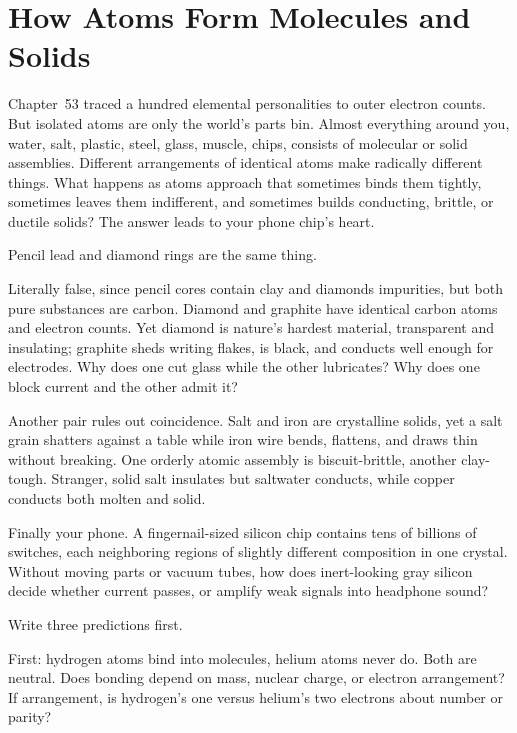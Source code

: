 \chapter{How Atoms Form Molecules and Solids}

Chapter~53 traced a hundred elemental personalities to outer electron counts. But isolated atoms are only the world's parts bin. Almost everything around you, water, salt, plastic, steel, glass, muscle, chips, consists of molecular or solid assemblies. Different arrangements of identical atoms make radically different things. What happens as atoms approach that sometimes binds them tightly, sometimes leaves them indifferent, and sometimes builds conducting, brittle, or ductile solids? The answer leads to your phone chip's heart.


Pencil lead and diamond rings are the same thing.

Literally false, since pencil cores contain clay and diamonds impurities, but both pure substances are carbon. Diamond and graphite have identical carbon atoms and electron counts. Yet diamond is nature's hardest material, transparent and insulating; graphite sheds writing flakes, is black, and conducts well enough for electrodes. Why does one cut glass while the other lubricates? Why does one block current and the other admit it?

Another pair rules out coincidence. Salt and iron are crystalline solids, yet a salt grain shatters against a table while iron wire bends, flattens, and draws thin without breaking. One orderly atomic assembly is biscuit-brittle, another clay-tough. Stranger, solid salt insulates but saltwater conducts, while copper conducts both molten and solid.

Finally your phone. A fingernail-sized silicon chip contains tens of billions of switches, each neighboring regions of slightly different composition in one crystal. Without moving parts or vacuum tubes, how does inert-looking gray silicon decide whether current passes, or amplify weak signals into headphone sound?


Write three predictions first.

First: hydrogen atoms bind into molecules, helium atoms never do. Both are neutral. Does bonding depend on mass, nuclear charge, or electron arrangement? If arrangement, is hydrogen's one versus helium's two electrons about number or parity?

